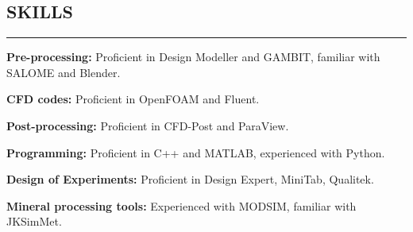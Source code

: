 \documentclass[10pt,a4]{article}
\begin{document}
\begin{small}


\subsection*{SKILLS}
\hrule
\vspace{0.2cm}
\begin{list}{}{}
	\item \textbf{Pre-processing:} Proficient in Design Modeller and GAMBIT, familiar with SALOME and Blender.
	\item \textbf{CFD codes:} Proficient in OpenFOAM and Fluent.
	\item \textbf{Post-processing:} Proficient in CFD-Post and ParaView.	
	\item \textbf{Programming:} Proficient in C++ and MATLAB, experienced with Python.
    \item \textbf{Design of Experiments:} Proficient in Design Expert, MiniTab, Qualitek.
    \item \textbf{Mineral processing tools:} Experienced with MODSIM, familiar with JKSimMet.
\end{list}




\end{small}
\end{document}
